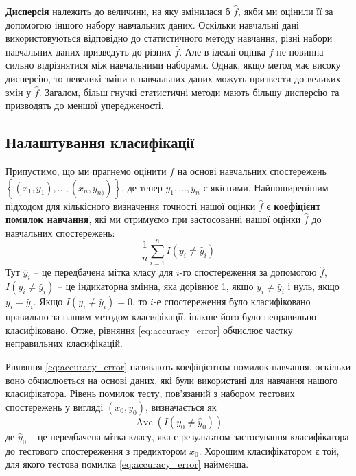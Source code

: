 \documentclass[14pt,a4paper]{extarticle}
\newcounter{e}
\numberwithin{equation}{section}
\numberwithin{figure}{section}
\begin{document}
    \textbf{Дисперсія} належить до величини, на яку змінилася б $\hat{f}$, якби ми оцінили її за допомогою іншого набору навчальних даних. Оскільки навчальні дані використовуються відповідно до статистичного методу навчання, різні набори навчальних даних призведуть до різних $\hat{f}$. Але в ідеалі оцінка $f$ не повинна сильно відрізнятися між навчальними наборами. Однак, якщо метод має високу дисперсію, то невеликі зміни в навчальних даних можуть призвести до великих змін у $\hat{f}$. Загалом, більш гнучкі статистичні методи мають більшу дисперсію та призводять до меншої упередженості.

    \subsection{Налаштування класифікації}

    Припустимо, що ми прагнемо оцінити $f$ на основі навчальних спостережень $\left\{\left(x_{1}, y_{1}\right), \ldots,\left(x_{n}, y_{n) }\right)\right\}$, де тепер $y_{1}, \ldots, y_{n}$ є якісними. Найпоширенішим підходом для кількісного визначення точності нашої оцінки $\hat{f}$ є \textbf{коефіцієнт помилок навчання}, які ми отримуємо при застосованні нашої оцінки $\hat{f}$ до навчальних спостережень:
    \begin{equation}
        \label{eq:accuracy_error}
    \frac{1}{n} \sum_{i=1}^{n} I\left(y_{i} \neq \hat{y}_{i}\right)
    \end{equation}
    Тут $\hat{y}_{i}$ – це передбачена мітка класу для $i$-го спостереження за допомогою $\hat{f}$, $I\left(y_{i} \neq \hat{y}_{i}\right)$ – це індикаторна змінна, яка дорівнює 1, якщо $y_{i} \neq \hat{y}_{i}$ і нуль, якщо $y_{i}=\hat{y}_{i}$. Якщо $I\left(y_{i} \neq \hat{y}_{i}\right)=0$, то $i$-е спостереження було класифіковано правильно за нашим методом класифікації, інакше його було неправильно класифіковано. Отже, рівняння \ref{eq:accuracy_error} обчислює частку неправильних класифікацій. \newline
 
	Рівняння \ref{eq:accuracy_error} називають коефіцієнтом помилок навчання, оскільки воно обчислюється на основі даних, які були використані для навчання нашого класифікатора. Рівень помилок тесту, пов'язаний з набором тестових спостережень у вигляді $\left(x_{0}, y_{0}\right)$, визначається як
    \begin{equation}
    \operatorname{Ave}\left(I\left(y_{0} \neq \hat{y}_{0}\right)\right)
    \end{equation}
    де $\hat{y}_{0}$ – це передбачена мітка класу, яка є результатом застосування класифікатора до тестового спостереження з предиктором $x_{0}$. Хорошим класифікатором є той, для якого тестова помилка \ref{eq:accuracy_error} найменша.
        
\end{document}
